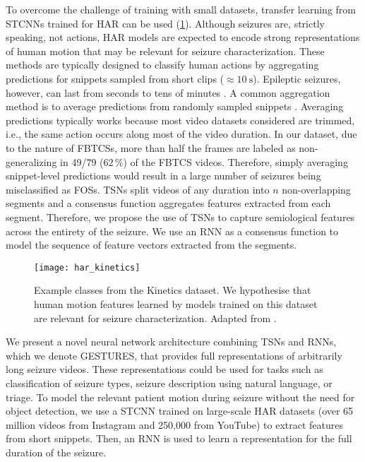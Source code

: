 To overcome the challenge of training with small datasets, transfer learning from \acp{STCNN} trained for \ac{HAR} can be used \cite{karacsony_deep_2020} (\cref{fig:kinetics}).
Although seizures are, strictly speaking, not actions, \ac{HAR} models are expected to encode strong representations of human motion that may be relevant for seizure characterization.
These methods are typically designed to classify human actions by aggregating predictions for snippets sampled from short clips ($\approx \SI{10}{\second}$).
Epileptic seizures, however, can last from seconds to tens of minutes \cite{jenssen_how_2006}.
A common aggregation method is to average predictions from randomly sampled snippets \cite{carreira_quo_2017,ghadiyaram_large-scale_2019,simonyan_two-stream_2014}.
Averaging predictions typically works because most video datasets considered are trimmed, i.e., the same action occurs along most of the video duration.
In our dataset, due to the nature of \acp{FBTCS}, more than half the frames are labeled as non-generalizing in 49/79 (62\,\%) of the \ac{FBTCS} videos.
Therefore, simply averaging snippet-level predictions would result in a large number of seizures being misclassified as \acp{FOS}.
\Acp{TSN} \cite{wang_temporal_2019} split videos of any duration into $n$ non-overlapping segments and a consensus function aggregates features extracted from each segment.
Therefore, we propose the use of \acp{TSN} to capture semiological features across the entirety of the seizure.
We use an \ac{RNN} as a consensus function to model the sequence of feature vectors extracted from the segments.

\begin{figure}[hbt!]
  \centering
  \texttt{[image: har\_kinetics]}
  \caption[Example classes from the Kinetics dataset]{
    Example classes from the Kinetics dataset.
    We hypothesise that human motion features learned by models trained on this dataset are relevant for seizure characterization.
    Adapted from \cite{kay_kinetics_2017}.
  }\label{fig:kinetics}
\end{figure}


We present a novel neural network architecture combining \acp{TSN} and \acp{RNN}, which we denote \ac{GESTURES}, that provides full representations of arbitrarily long seizure videos.
These representations could be used for tasks such as classification of seizure types, seizure description using natural language, or triage.
To model the relevant patient motion during seizure without the need for object detection, we use a \ac{STCNN} trained on large-scale \ac{HAR} datasets (over 65 million videos from Instagram and 250,000 from YouTube) \cite{ghadiyaram_large-scale_2019} to extract features from short snippets.
Then, an \ac{RNN} is used to learn a representation for the full duration of the seizure.

